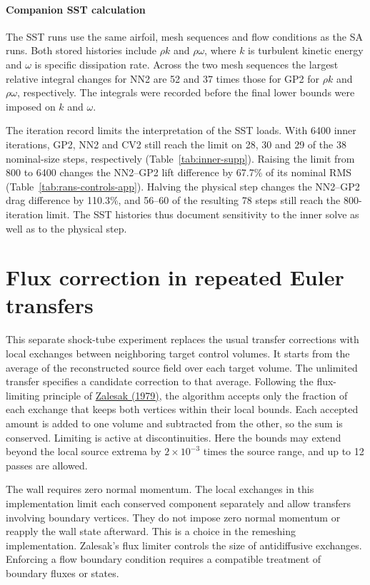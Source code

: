 \documentclass[11pt,a4paper]{article}
\begin{document}
\paragraph{Companion SST calculation}
The SST runs use the same airfoil, mesh sequences and flow conditions as the SA runs. Both stored histories include $\rho k$ and $\rho\omega$, where $k$ is turbulent kinetic energy and $\omega$ is specific dissipation rate. Across the two mesh sequences the largest relative integral changes for NN2 are 52 and 37 times those for GP2 for $\rho k$ and $\rho\omega$, respectively. The integrals were recorded before the final lower bounds were imposed on $k$ and $\omega$.

The iteration record limits the interpretation of the SST loads. With 6400 inner iterations, GP2, NN2 and CV2 still reach the limit on 28, 30 and 29 of the 38 nominal-size steps, respectively (Table~\ref{tab:inner-supp}). Raising the limit from 800 to 6400 changes the NN2--GP2 lift difference by 67.7\% of its nominal RMS (Table~\ref{tab:rans-controls-app}). Halving the physical step changes the NN2--GP2 drag difference by 110.3\%, and 56--60 of the resulting 78 steps still reach the 800-iteration limit. The SST histories thus document sensitivity to the inner solve as well as to the physical step.

\FloatBarrier
\section{Flux correction in repeated Euler transfers}
\label{supp:flux-correction}

This separate shock-tube experiment replaces the usual transfer corrections with local exchanges between neighboring target control volumes. It starts from the average of the reconstructed source field over each target volume. The unlimited transfer specifies a candidate correction to that average. Following the flux-limiting principle of \href{https://doi.org/10.1016/0021-9991(79)90051-2}{Zalesak (1979)}, the algorithm accepts only the fraction of each exchange that keeps both vertices within their local bounds. Each accepted amount is added to one volume and subtracted from the other, so the sum is conserved. Limiting is active at discontinuities. Here the bounds may extend beyond the local source extrema by $2\times10^{-3}$ times the source range, and up to 12 passes are allowed.

The wall requires zero normal momentum. The local exchanges in this implementation limit each conserved component separately and allow transfers involving boundary vertices. They do not impose zero normal momentum or reapply the wall state afterward. This is a choice in the remeshing implementation. Zalesak's flux limiter controls the size of antidiffusive exchanges. Enforcing a flow boundary condition requires a compatible treatment of boundary fluxes or states.
\end{document}
